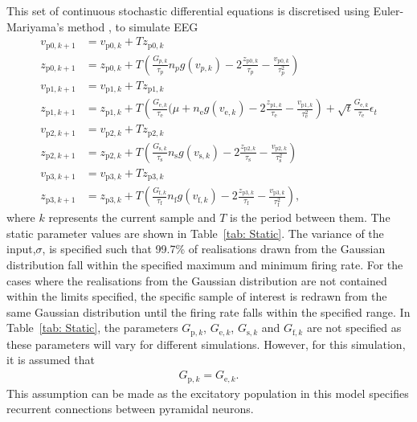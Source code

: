 This set of continuous stochastic differential equations is discretised using Euler-Mariyama's method \iref, to simulate EEG \begin{align}
\label{eqn: EulerW1}
v_{\mathrm{p0},k+1}&=v_{\mathrm{p0},k}+Tz_{\mathrm{p0},k}\\
z_{\mathrm{p0},k+1}&=z_{\mathrm{p0},k}+T\left(\frac{G_{p,k}}{\tau_{p}}n_{p}g(v_{p,k})-2\frac{z_{\mathrm{p0},k}}{\tau_{p}}-\frac{v_{\mathrm{p0},k}}{\tau_{p}^{2}}\right)\\
v_{\mathrm{p1},k+1}&=v_{\mathrm{p1},k}+Tz_{\mathrm{p1},k}\\
z_{\mathrm{p1},k+1}&=z_{\mathrm{p1},k}+T\left(\frac{G_{\mathrm{e},k}}{\tau_{\mathrm{e}}}(\mu +n_{\mathrm{e}}g(v_{\mathrm{e},k})-2\frac{z_{\mathrm{p1},k}}{\tau_{\mathrm{e}}}-\frac{v_{\mathrm{p1},k}}{\tau_{\mathrm{e}}^{2}}\right) + \sqrt{t}\frac{G_{\mathrm{e},k}}{\tau_{\mathrm{e}}}\epsilon_{t}\\
v_{\mathrm{p2},k+1}&=v_{\mathrm{p2},k}+Tz_{\mathrm{p2},k}\\
z_{\mathrm{p2},k+1}&=z_{\mathrm{p2},k}+T\left(\frac{G_{\mathrm{s},k}}{\tau_{\mathrm{s}}}n_{\mathrm{s}}g(v_{\mathrm{s},k})-2\frac{z_{\mathrm{p2},k}}{\tau_{\mathrm{s}}}-\frac{v_{\mathrm{p2},k}}{\tau_{\mathrm{s}}^{2}}\right)\\
v_{\mathrm{p3},k+1}&=v_{\mathrm{p3},k}+Tz_{\mathrm{p3},k}\\
\label{eqn: EulerW8}
z_{\mathrm{p3},k+1}&=z_{\mathrm{p3},k}+T\left(\frac{G_{\mathrm{f},k}}{\tau_{\mathrm{f}}}n_{\mathrm{f}}g(v_{\mathrm{f},k})-2\frac{z_{\mathrm{p3},k}}{\tau_{\mathrm{f}}}-\frac{v_{\mathrm{p3},k}}{\tau_{\mathrm{f}}^{2}}\right),
\end{align} where $k$ represents the current sample and $T$ is the period between them. The static parameter values are shown in Table~\ref{tab: Static}. The variance of the input,$\sigma$, is specified such that 99.7\% of realisations drawn from the Gaussian distribution fall within the specified maximum and minimum firing rate. For the cases where the realisations from the Gaussian distribution are not contained within the limits specified, the specific sample of interest is redrawn from the same Gaussian distribution until the firing rate falls within the specified range. In Table~\ref{tab: Static}, the parameters $G_{\mathrm{p},k}$, $G_{\mathrm{e},k}$, $G_{\mathrm{s},k}$ and $G_{\mathrm{f},k}$ are not specified as these parameters will vary for different simulations. However, for this simulation, it is assumed that \begin{align}
G_{\mathrm{p},k} = G_{\mathrm{e},k}.
\end{align} This assumption can be made as the excitatory population in this model specifies recurrent connections between pyramidal neurons.  
